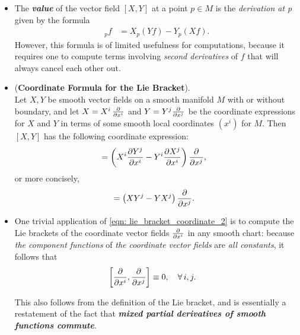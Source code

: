\documentclass[11pt]{article}
\begin{document}
\begin{itemize}
\item \begin{remark}
The \textit{\textbf{value}} of the vector field $[X,Y]$ at a point $p \in M$ is the \emph{derivation at p} given
by the formula
\begin{align}
[X, Y] _{p}f &=  X_{p}(Yf)- Y_{p}(Xf). \label{eqn: lie_bracket_at_point}
\end{align} However, this formula is of limited usefulness for computations, because it requires one to compute terms involving \emph{second derivatives} of $f$ that will always cancel each other out. 
\end{remark}


\item \begin{proposition} (\textbf{Coordinate Formula for the Lie Bracket}). \citep{lee2003introduction} \\
Let $X, Y$ be smooth vector fields on a smooth manifold $M$ with or without boundary, and let $X = X^i\,\frac{\partial }{ \partial x^{i}}$ and $Y = Y^j\frac{\partial }{ \partial x^{j}}$ be the coordinate expressions for $X$ and $Y$ in terms of some smooth local coordinates $(x^i)$ for $M$. Then $[X, Y]$ has the following coordinate expression:
\begin{align}
[X, Y]&= \paren{X^{i}\partdiff{Y^{j}}{x^{i}} - Y^{i}\partdiff{X^{j}}{x^{i}} }\partdiff{}{x^{j}},  \label{eqn: lie_bracket_coordinate}
\end{align} or more concisely,
\begin{align}
[X, Y]&= \paren{XY^{j}  - YX^{j}}\partdiff{}{x^{j}}.  \label{eqn: lie_bracket_coordinate_2}
\end{align}
\end{proposition}

\item \begin{remark} One trivial application of \eqref{eqn: lie_bracket_coordinate_2} is to compute the Lie brackets of the coordinate
vector fields $\frac{\partial }{ \partial x^{i}}$  in any smooth chart: because \emph{the component functions} of \emph{the coordinate vector fields} are \emph{all constants}, it follows that
\begin{align}
\left[\frac{\partial }{ \partial x^{i}},  \frac{\partial }{ \partial x^{j}}\right]&\equiv 0, \quad \forall\, i,j.  \label{eqn: lie_bracket_coordinate_vector_fields}
\end{align} 

This also follows from the definition of the Lie bracket, and is essentially a restatement of the fact that \emph{\textbf{mixed partial derivatives of smooth functions commute}}.
\end{remark}


\end{itemize}
\end{document}
